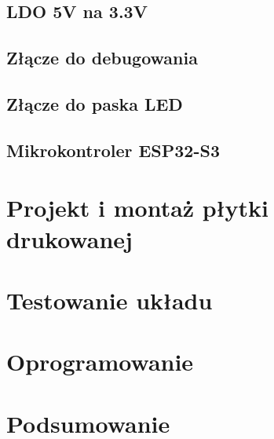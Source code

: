 \documentclass[twoside]{article}
\begin{document}
\subsection{LDO 5V na 3.3V}

\newpage

\subsection{Złącze do debugowania}

\newpage

\subsection{Złącze do paska LED}

\newpage

\subsection{Mikrokontroler ESP32-S3}

\newpage

\section{Projekt i montaż płytki drukowanej}


\newpage

\section{Testowanie układu}
\label{sec:testy}

\newpage

\section{Oprogramowanie}

\newpage


\section{Podsumowanie}
\newpage

\printbibliography[]
\newpage
\listoffigures
{}
\newpage
\listoftables
{}
\end{document}

